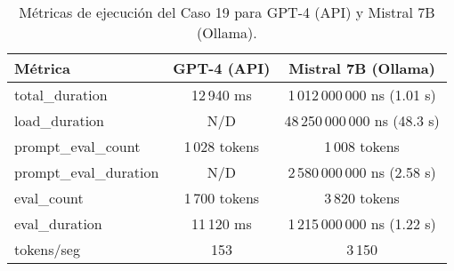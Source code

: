 
\begin{table}[h!]
\centering
\begin{tabular}{|l|c|c|}
\hline
\textbf{Métrica} & \textbf{GPT-4 (API)} & \textbf{Mistral 7B (Ollama)} \\
\hline
total\_duration & 12\,940 ms & 1\,012\,000\,000 ns (1.01 s) \\
load\_duration & N/D & 48\,250\,000\,000 ns (48.3 s) \\
prompt\_eval\_count & 1\,028 tokens & 1\,008 tokens \\
prompt\_eval\_duration & N/D & 2\,580\,000\,000 ns (2.58 s) \\
eval\_count & 1\,700 tokens & 3\,820 tokens \\
eval\_duration & 11\,120 ms & 1\,215\,000\,000 ns (1.22 s) \\
tokens/seg & 153 & 3\,150 \\
\hline
\end{tabular}
\caption{Métricas de ejecución del Caso 19 para GPT-4 (API) y Mistral 7B (Ollama).}
\end{table}
